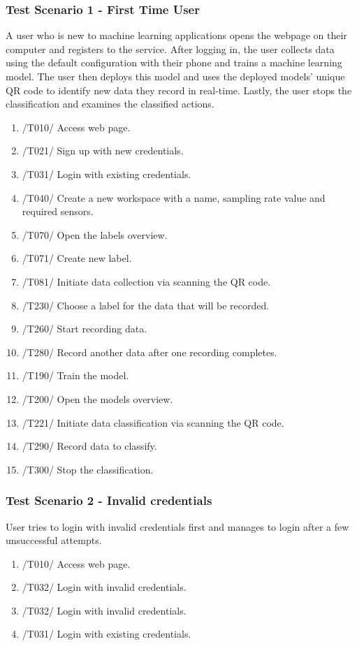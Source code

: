 \subsubsection{Test Scenario 1 - First Time User}
A user who is new to machine learning applications opens the webpage on their computer and registers to the service. After logging in, the user collects data using the default configuration with their phone and trains a machine learning model. The user then deploys this model and uses the deployed models' unique QR code to identify new data they record in real-time. Lastly, the user stops the classification and examines the classified actions.
\begin{enumerate}
    \item /T010/ Access web page.
    \item /T021/ Sign up with new credentials.
    \item /T031/ Login with existing credentials.
    \item /T040/ Create a new workspace with a name, sampling rate value and required sensors.
    \item /T070/ Open the labels overview.
    \item /T071/ Create new label.
    \item /T081/ Initiate data collection via scanning the QR code.
    \item /T230/ Choose a label for the data that will be recorded.
    \item /T260/ Start recording data.
    \item /T280/ Record another data after one recording completes.
    \item /T190/ Train the model.
    \item /T200/ Open the models overview.
    \item /T221/ Initiate data classification via scanning the QR code.
    \item /T290/ Record data to classify.
    \item /T300/ Stop the classification.
\end{enumerate}
\subsubsection{Test Scenario 2 - Invalid credentials}
User tries to login with invalid credentials first and manages to login after a few unsuccessful attempts.
\begin{enumerate}
    \item /T010/ Access web page.
    \item /T032/ Login with invalid credentials.
    \item /T032/ Login with invalid credentials.
    \item /T031/ Login with existing credentials.
\end{enumerate}
